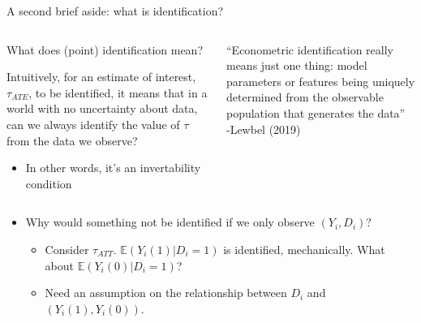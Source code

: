 \documentclass[notes,11pt, aspectratio=169]{beamer}
\newenvironment{wideitemize}{\itemize\addtolength{\itemsep}{10pt}}{\enditemize}
\begin{document}
\begin{frame}{A second brief aside: what is identification?}
\begin{columns}[T] %
\begin{column}{.6\textwidth}
  \begin{wideitemize}
  \item What does (point) identification mean?
    \pause
  \item Intuitively, for an estimate of interest,
    $\tau_{ATE}$, to be identified, it means that in a world
    with no uncertainty about data, can we always identify the value
    of $\tau$ from the data we observe?
    \begin{itemize}
    \item In other words, it's an invertability condition
    \end{itemize}
  \end{wideitemize}
\end{column}%
\hfill%
\begin{column}{.38\textwidth}
  \vspace{20pt}
``Econometric identification really means
just one thing: model parameters or
features being uniquely determined from
the observable population that generates
the data''\\
\hfill -Lewbel (2019)
\end{column}%
\end{columns}

\pause
\vspace{5pt}
\begin{itemize}
  \item Why would something not be identified if we only observe $(Y_{i}, D_{i})$?
    \begin{itemize}
    \item Consider $\tau_{ATT}$. $\mathbb{E}(Y_{i}(1)| D_{i}= 1)$ is
      identified, mechanically. What about $\mathbb{E}(Y_{i}(0) | D_{i} = 1)$?
    \item Need an assumption on the relationship between $D_{i}$ and
      $(Y_{i}(1), Y_{i}(0))$.
    \end{itemize}
\end{itemize}
\end{frame}
\end{document}
